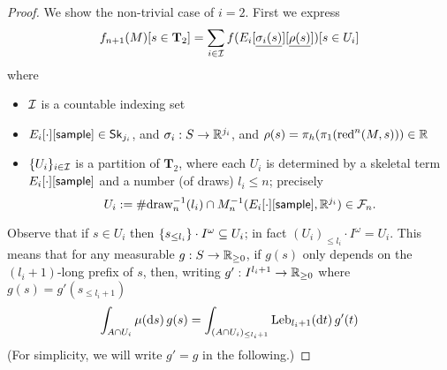 \begin{proof}
We show the non-trivial case of $i = 2$.
First we express 
\begin{equation}
f_{n+1}(M)[s \in \mathbf{T}_2] = \sum_{i \in \mathcal{I}} 
f(E_i[\underline{\sigma_i(s)}][\underline{\rho(s)}])[s \in U_i]
\label{eqn:f 2 n+1}
\end{equation}
where 
\begin{itemize}
\item $\mathcal{I}$ is a countable indexing set
\item $E_i[\cdot][\textsf{sample}] \in \mathsf{Sk}_{j_i}$, and $\sigma_i : S \to \mathbb{R}^{j_i}$, and $\rho(s) = \pi_h(\pi_1(\operatorname{red}^n(M, s))) \in \mathbb{R}$ 
\item $\{U_i\}_{i \in \mathcal{I}}$ is a partition of $\mathbf{T}_2$, 
where each $U_i$ is determined by a skeletal term $E_i[\cdot][\textsf{sample}]$ and a number (of draws) $l_i \leq n$;
precisely 
\[
U_i := \#\mathrm{draw}_n^{-1}(l_i) \cap M_n^{-1}(E_i[\cdot][\textsf{sample}], \mathbb{R}^{j_i}) \in \mathcal{F}_n.
\]
\end{itemize}

Observe that if $s \in U_i$ then $\{s_{\leq l_i}\} \cdot I^\omega \subseteq U_i$;
in fact $(U_i)_{\leq l_i} \cdot I^\omega = U_i$.
This means that for any measurable $g : S \to \mathbb{R}_{\geq 0}$, if $g(s)$ only depends on the $(l_i+1)$-long prefix of $s$, then, writing $g' : I^{l_i+1} \to \mathbb{R}_{\geq 0}$ where $g(s) = g'(s_{\leq l_i+1})$ 
\begin{equation}
\int_{A \cap U_i}  \mu(\mathrm{d} s) \, g(s) = 
\int_{(A \cap U_i)_{\leq l_i+1}} \mathrm{Leb}_{l_i+1}(\mathrm{d} t) \, g'(t)
\label{eqn:truncate}
\end{equation}
(For simplicity, we will write $g' = g$ in the following.)


\end{proof}
